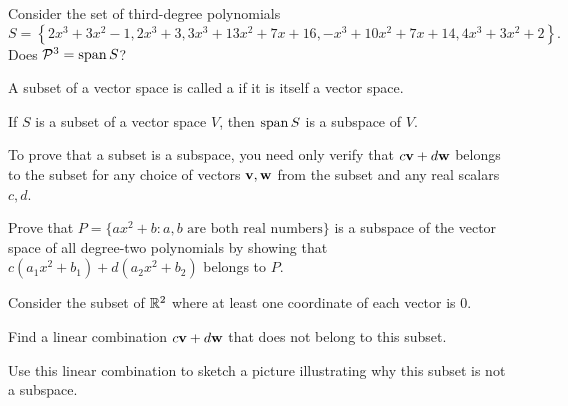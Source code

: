 \begin{applicationActivities}
\begin{activity}{10}
  Consider the set of third-degree polynomials \[S=\left\{
  2x^3+3x^2-1,
  2x^3+3,
  3x^3+13x^2+7x+16,
  -x^3+10x^2+7x+14,
  4x^3+3x^2+2
  \right\}
  .\]
  Does
  \(\mathcal{P}^3=\operatorname{span} S\)?
\end{activity}

\begin{definition}
  A subset of a vector space is called a  if it is
  itself a vector space.
\end{definition}

\begin{fact}
  If \(S\) is a subset of a vector space \(V\), then
  \(\operatorname{span} S\) is a subspace of \(V\).
\end{fact}

\begin{remark}
  To prove that a subset is a subspace, you need only verify that
  \(c\mathbf v+d\mathbf w\) belongs to the subset for any choice of
  vectors \(\mathbf v,\mathbf w\) from the subset and any real scalars \(c,d\).
\end{remark}

\begin{activity}{5}
  Prove that \(P=\{ax^2+b:a,b\text{ are both real numbers}\}\) is a subspace
  of the vector space of all degree-two polynomials by showing that
  \(c(a_1x^2+b_1)+d(a_2x^2+b_2)\) belongs to \(P\).
\end{activity}

\begin{activity}{10}
  Consider the subset of \(\mathbb{R}^2\) where at least one coordinate of
  each vector is \(0\).
  \begin{center}
  \end{center}
    Find a linear combination
    \(c\mathbf v+
    d\mathbf w\) that does not
    belong to this subset.
  \begin{instructorNote}
    Use this linear combination to sketch a picture
    illustrating why this subset is not
    a subspace.
  \end{instructorNote}
\end{activity}


\end{applicationActivities}
